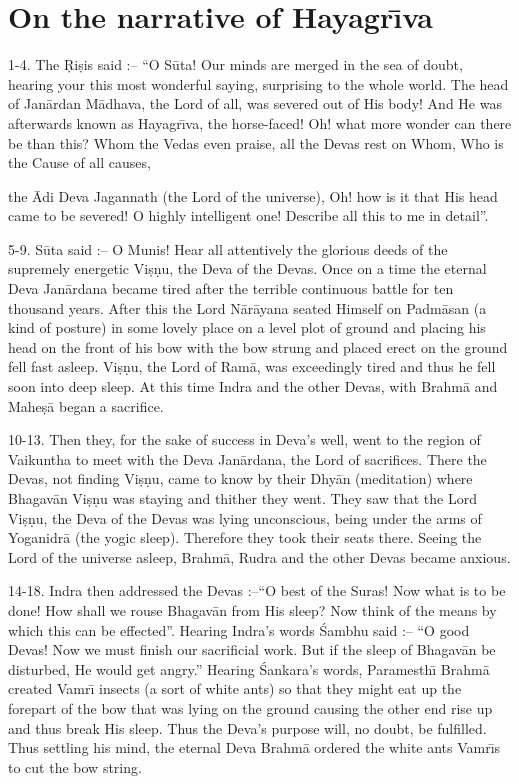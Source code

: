 \chapter{On the narrative of Hayagr\={\i}va}

1-4. The \d{R}i\d{s}is said :-- ``O S\=uta! Our minds are merged in the sea of doubt, hearing your this most wonderful saying, surprising to the whole world. The head of Jan\=ardan M\=adhava, the Lord of all, was severed out of His body! And He was afterwards known as Hayagr\={\i}va, the horse-faced! Oh! what more wonder can there be than this? Whom the Vedas even praise, all the Devas rest on Whom, Who is the Cause of all causes,

the \=Adi Deva Jagannath (the Lord of the universe), Oh! how is it that His head came to be severed! O highly intelligent one! Describe all this to me in detail''.

5-9. S\=uta said :-- O Munis! Hear all attentively the glorious deeds of the supremely energetic Vi\d{s}\d{n}u, the Deva of the Devas. Once on a time the eternal Deva Jan\=ardana became tired after the terrible continuous battle for ten thousand years. After this the Lord N\=ar\=ayana seated Himself on Padm\=asan (a kind of posture) in some lovely place on a level plot of ground and placing his head on the front of his bow with the bow strung and placed erect on the ground fell fast asleep. Vi\d{s}\d{n}u, the Lord of Ram\=a, was exceedingly tired and thus he fell soon into deep sleep. At this time Indra and the other Devas, with Brahm\=a and Mahe\d{s}\=a began a sacrifice.

10-13. Then they, for the sake of success in Deva's well, went to the region of Vaikuntha to meet with the Deva Jan\=ardana, the Lord of sacrifices. There the Devas, not finding Vi\d{s}\d{n}u, came to know by their Dhy\=an (meditation) where Bhagav\=an Vi\d{s}\d{n}u was staying and thither they went. They saw that the Lord Vi\d{s}\d{n}u, the Deva of the Devas was lying unconscious, being under the arms of Yoganidr\=a (the yogic sleep). Therefore they took their seats there. Seeing the Lord of the universe asleep, Brahm\=a, Rudra and the other Devas became anxious.

14-18. Indra then addressed the Devas :--``O best of the Suras! Now what is to be done! How shall we rouse Bhagav\=an from His sleep? Now think of the means by which this can be effected''. Hearing Indra's words \'Sambhu said :-- ``O good Devas! Now we must finish our sacrificial work. But if the sleep of Bhagav\=an be disturbed, He would get angry.'' Hearing \'Sankara's words, Paramesth\={\i} Brahm\=a created Vamr\={\i} insects (a sort of white ants) so that they might eat up the forepart of the bow that was lying on the ground causing the other end rise up and thus break His sleep. Thus the Deva's purpose will, no doubt, be fulfilled. Thus settling his mind, the eternal Deva Brahm\=a ordered the white ants Vamr\={\i}s to cut the bow string.

